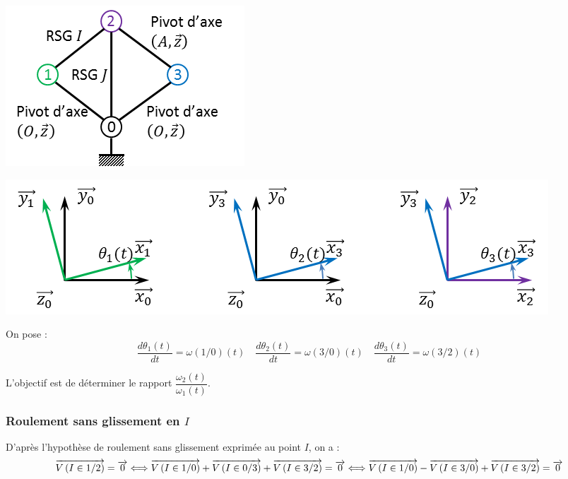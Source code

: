 \documentclass[10pt,oneside]{article}
\begin{document}
\begin{minipage}[c]{.34\linewidth}
\begin{center}
\includegraphics[width=\textwidth]{png/graphe_liaisons}
\end{center}
\end{minipage}\hfill
\begin{minipage}[c]{.64\linewidth}
\begin{center}
\includegraphics[width=.95\textwidth]{png/parametrage_epi}
\end{center}
\end{minipage}
On pose :
$$
\dfrac{d\theta_1(t)}{dt} = \omega(1/0)(t)
\quad
\dfrac{d\theta_2(t)}{dt} =\omega(3/0)(t)
\quad
\dfrac{d\theta_3(t)}{dt} =\omega(3/2)(t)
$$
\begin{obj}
L'objectif est de déterminer le rapport $\dfrac{\omega_2(t)}{\omega_1(t)}$.
\end{obj}
\subsubsection{Roulement sans glissement en $I$}
D'après l'hypothèse de roulement sans glissement exprimée au point $I$, on a : 
$$
\overrightarrow{V\left( {I} \in {1}/{2}\right)} = \overrightarrow{0} 
\Longleftrightarrow 
\overrightarrow{V\left( {I} \in {1}/{0}\right)} + \overrightarrow{V\left( {I} \in {0}/{3}\right)} + \overrightarrow{V\left( {I} \in {3}/{2}\right)} = \overrightarrow{0} 
\Longleftrightarrow 
\overrightarrow{V\left( {I} \in {1}/{0}\right)} - \overrightarrow{V\left( {I} \in {3}/{0}\right)} + \overrightarrow{V\left( {I} \in {3}/{2}\right)} = \overrightarrow{0} 
$$
\end{document}
